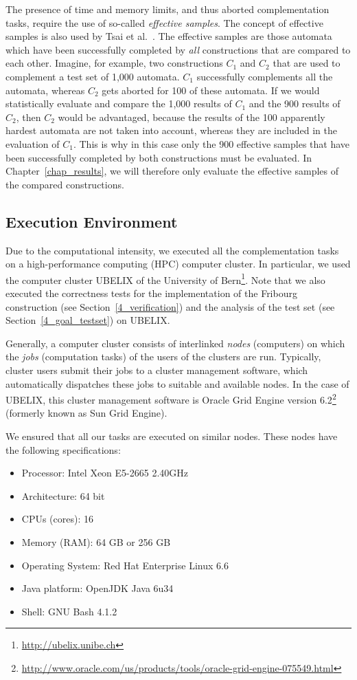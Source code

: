 The presence of time and memory limits, and thus aborted complementation tasks, require the use of so-called \textit{effective samples}. The concept of effective samples is also used by Tsai et al.~\cite{2011_tsai}. The effective samples are those automata which have been successfully completed by \textit{all} constructions that are compared to each other. Imagine, for example, two constructions $C_1$ and $C_2$ that are used to complement a test set of 1,000 automata. $C_1$ successfully complements all the automata, whereas $C_2$ gets aborted for 100 of these automata. If we would statistically evaluate and compare the 1,000 results of $C_1$ and the 900 results of $C_2$, then $C_2$ would be advantaged, because the results of the 100 apparently hardest automata are not taken into account, whereas they are included in the evaluation of $C_1$. This is why in this case only the 900 effective samples that have been successfully completed by both constructions must be evaluated. In Chapter~\ref{chap_results}, we will therefore only evaluate the effective samples of the compared constructions.


\subsection{Execution Environment}
\label{4_exec_env}
Due to the computational intensity, we executed all the complementation tasks on a high-performance computing (HPC) computer cluster. In particular, we used the computer cluster UBELIX of the University of Bern\footnote{\url{http://ubelix.unibe.ch}}. Note that we also executed the correctness tests for the implementation of the Fribourg construction (see Section~\ref{4_verification}) and the analysis of the \goal{} test set (see Section~\ref{4_goal_testset}) on UBELIX.

Generally, a computer cluster consists of interlinked \textit{nodes} (computers) on which the \textit{jobs} (computation tasks) of the users of the clusters are run. Typically, cluster users submit their jobs to a cluster management software, which automatically dispatches these jobs to suitable and available nodes. In the case of UBELIX, this cluster management software is Oracle Grid Engine version 6.2\footnote{\url{http://www.oracle.com/us/products/tools/oracle-grid-engine-075549.html}} (formerly known as Sun Grid Engine).

We ensured that all our tasks are executed on similar nodes. These nodes have the following specifications:
\begin{itemize}
\item Processor:        \tabto{3.25cm} Intel Xeon E5-2665 2.40GHz
\item Architecture:     \tabto{3.25cm} 64 bit
\item CPUs (cores):     \tabto{3.25cm} 16
\item Memory (RAM):     \tabto{3.25cm} 64 GB or 256 GB
\item Operating System: \tabto{3.25cm} Red Hat Enterprise Linux 6.6
\item Java platform:    \tabto{3.25cm} OpenJDK Java 6u34
\item Shell:            \tabto{3.25cm} GNU Bash 4.1.2
\end{itemize}

